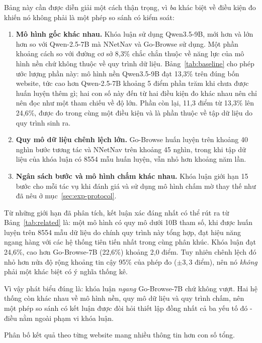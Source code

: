 Bảng này cần được diễn giải một cách thận trọng, vì \emph{ba} khác biệt về điều kiện đo khiến nó không phải là một phép so sánh có kiểm soát:

\begin{enumerate}
  \item \textbf{Mô hình gốc khác nhau.} Khóa luận sử dụng Qwen3.5-9B, mới hơn
    và lớn hơn so với Qwen-2.5-7B mà NNetNav và Go-Browse sử dụng. Một phần
    khoảng cách so với đường cơ sở 8{,}3\% chắc chắn thuộc về năng lực của mô
    hình nền chứ không thuộc về quy trình dữ liệu. Bảng~\ref{tab:baseline} cho
    phép ước lượng phần này: mô hình nền Qwen3.5-9B đạt 13{,}3\% trên đúng bốn
    website, tức cao hơn Qwen-2.5-7B khoảng 5 điểm phần trăm khi chưa được huấn
    luyện thêm gì; hai con số này đến từ hai điều kiện đo khác nhau nên chỉ nên
    đọc như một tham chiếu về độ lớn. Phần còn lại, 11{,}3 điểm từ 13{,}3\% lên
    24{,}6\%, được đo trong cùng một điều kiện và là phần thuộc về tập dữ liệu
    do quy trình sinh ra.
  \item \textbf{Quy mô dữ liệu chênh lệch lớn.} Go-Browse huấn luyện trên
    khoảng 40 nghìn bước tương tác và NNetNav trên khoảng 45 nghìn, trong khi
    tập dữ liệu của khóa luận có 8554 mẫu huấn luyện, vẫn nhỏ hơn khoảng năm
    lần.
  \item \textbf{Ngân sách bước và mô hình chấm khác nhau.} Khóa luận giới hạn
    15 bước cho mỗi tác vụ khi đánh giá và sử dụng mô hình chấm mờ thay thế như đã
    nêu ở mục~\ref{sec:exp-protocol}.
\end{enumerate}

Từ những giới hạn đã phân tích, kết luận xác đáng nhất có thể rút ra từ Bảng~\ref{tab:related} là: một mô hình có quy mô dưới 10B tham số, khi được huấn luyện trên 8554 mẫu dữ liệu do chính quy trình này tổng hợp, đạt hiệu năng ngang hàng với các hệ thống tiên tiến nhất trong cùng phân khúc. Khóa luận đạt 24{,}6\%, cao hơn Go-Browse-7B (22{,}6\%) khoảng 2{,}0 điểm. Tuy nhiên chênh lệch đó nhỏ hơn nửa độ rộng khoảng tin cậy 95\% của phép đo ($\pm3{,}3$ điểm), nên nó \emph{không} phải một khác biệt có ý nghĩa thống kê.

Vì vậy phát biểu đúng là: khóa luận \emph{ngang} Go-Browse-7B chứ không vượt. Hai hệ thống còn khác nhau về mô hình nền, quy mô dữ liệu và quy trình chấm, nên một phép so sánh có kết luận được đòi hỏi thiết lập đồng nhất cả ba yếu tố đó - điều nằm ngoài phạm vi khóa luận.

Phân bố kết quả theo từng website mang nhiều thông tin hơn con số tổng.

